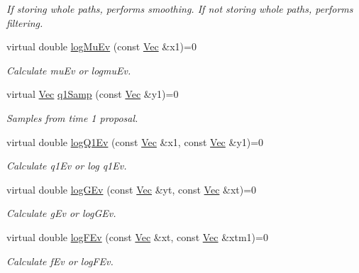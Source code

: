 \begin{DoxyCompactItemize}
\begin{DoxyCompactList}\small\item\em If storing whole paths, performs smoothing. If not storing whole paths, performs filtering. \end{DoxyCompactList}\item 
virtual double \hyperlink{classSISRFilter_ab6ffa8e1cdee34f1afb825e35462afaa}{log\+Mu\+Ev} (const \hyperlink{apf__filter_8h_a4c7df05c6f5e8a0d15ae14bcdbc07152}{Vec} \&x1)=0
\begin{DoxyCompactList}\small\item\em Calculate mu\+Ev or logmu\+Ev. \end{DoxyCompactList}\item 
virtual \hyperlink{apf__filter_8h_a4c7df05c6f5e8a0d15ae14bcdbc07152}{Vec} \hyperlink{classSISRFilter_a5a57cd67535e31bb1ab20fb42499f911}{q1\+Samp} (const \hyperlink{apf__filter_8h_a4c7df05c6f5e8a0d15ae14bcdbc07152}{Vec} \&y1)=0
\begin{DoxyCompactList}\small\item\em Samples from time 1 proposal. \end{DoxyCompactList}\item 
virtual double \hyperlink{classSISRFilter_a61a1971bd8208abbe3ccbacd66d35c23}{log\+Q1\+Ev} (const \hyperlink{apf__filter_8h_a4c7df05c6f5e8a0d15ae14bcdbc07152}{Vec} \&x1, const \hyperlink{apf__filter_8h_a4c7df05c6f5e8a0d15ae14bcdbc07152}{Vec} \&y1)=0
\begin{DoxyCompactList}\small\item\em Calculate q1\+Ev or log q1\+Ev. \end{DoxyCompactList}\item 
virtual double \hyperlink{classSISRFilter_aac59b077648fa74d2a5db970e3d7ffac}{log\+G\+Ev} (const \hyperlink{apf__filter_8h_a4c7df05c6f5e8a0d15ae14bcdbc07152}{Vec} \&yt, const \hyperlink{apf__filter_8h_a4c7df05c6f5e8a0d15ae14bcdbc07152}{Vec} \&xt)=0
\begin{DoxyCompactList}\small\item\em Calculate g\+Ev or log\+G\+Ev. \end{DoxyCompactList}\item 
virtual double \hyperlink{classSISRFilter_ab91474fc79efb84ed1dafbc8c542f59e}{log\+F\+Ev} (const \hyperlink{apf__filter_8h_a4c7df05c6f5e8a0d15ae14bcdbc07152}{Vec} \&xt, const \hyperlink{apf__filter_8h_a4c7df05c6f5e8a0d15ae14bcdbc07152}{Vec} \&xtm1)=0
\begin{DoxyCompactList}\small\item\em Calculate f\+Ev or log\+F\+Ev. \end{DoxyCompactList}\item 

\end{DoxyCompactItemize}
